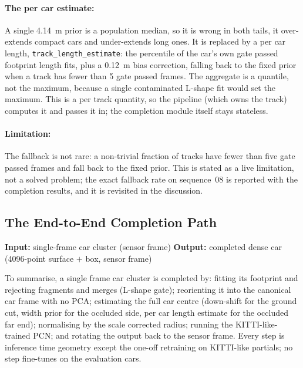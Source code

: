 \documentclass[a4paper,12pt]{report}
\begin{document}
\paragraph{The per car estimate:} A single \SI{4.14}{\meter}
prior is a population median, so it is wrong in both tails, it over-extends
compact cars and under-extends long ones. It is replaced by a per car length,
\texttt{track\_length\_estimate}: the  percentile of the car's own
gate passed footprint length fits, plus a \SI{0.12}{\meter} bias correction,
falling back to the fixed prior when a track has fewer than \num{5} gate passed
frames. The aggregate is a quantile, not the maximum, because a single
contaminated L-shape fit would set the maximum. This is a per track quantity, so the
pipeline (which owns the track) computes it and passes it in; the completion module itself
stays stateless.

\paragraph{Limitation:} The fallback is not rare: a non-trivial fraction of tracks have
fewer than five gate passed frames and fall back to the fixed prior. This is stated as a
live limitation, not a solved problem; the exact fallback rate on sequence~08 is reported
with the completion results, and it is revisited in the discussion.

\subsection{The End-to-End Completion Path}
\label{sec:completion-summary}

\noindent \textbf{Input:} single-frame car cluster (sensor frame) \quad \textbar \quad \textbf{Output:} completed dense car (\num{4096}-point surface $+$ box, sensor frame) \vspace{0.5em}

To summarise, a single frame car cluster is completed by: fitting its footprint
and rejecting fragments and merges (L-shape gate); reorienting it into the
canonical car frame with no PCA; estimating the full car centre (down-shift for
the ground cut, width prior for the occluded side, per car length estimate for
the occluded far end); normalising by the scale corrected radius; running the
KITTI-like-trained PCN; and rotating the output back to the sensor frame. Every
step is inference time geometry except the one-off retraining on KITTI-like
partials; no step fine-tunes on the evaluation cars.
\end{document}
